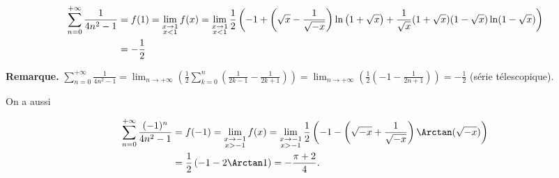 {{\begin{align*}\ensuremath
 \sum_{n=0}^{+\infty}\frac{1}{4n^2-1}&=f(1)=\displaystyle\lim_{\substack{x\rightarrow1\\ x<1}}f(x)
=\displaystyle\lim_{\substack{x\rightarrow1\\ x<1}}\frac{1}{2}\left(-1+\left(\sqrt{x}-\frac{1}{\sqrt{-x}} \right)\ln\left(1+\sqrt{x}\right) +\frac{1}{\sqrt{x}}(1+\sqrt{x})(1-\sqrt{x})\ln(1-\sqrt{x})\right)\\
 &=-\frac{1}{2}
\end{align*} 
			

\textbf{Remarque.} $\sum_{n=0}^{+\infty}\frac{1}{4n^2-1}=\lim_{n \rightarrow +\infty}\left(\frac{1}{2}\sum_{k=0}^{n}\left(\frac{1}{2k-1}-\frac{1}{2k+1}\right)\right)=\lim_{n \rightarrow +\infty}\left(\frac{1}{2}\left(-1-\frac{1}{2n+1}\right)\right)=-\frac{1}{2}$ (série télescopique).

On a aussi

\begin{align*}\ensuremath
 \sum_{n=0}^{+\infty}\frac{(-1)^n}{4n^2-1}&=f(-1)=\displaystyle\lim_{\substack{x\rightarrow-1\\ x>-1}}f(x)
=\displaystyle\lim_{\substack{x\rightarrow-1\\ x>-1}}\frac{1}{2}\left(-1-\left(\sqrt{-x}+\frac{1}{\sqrt{-x}} \right)\Arctan(\sqrt{-x})\right)\\
 &=\frac{1}{2}\left(-1-2\Arctan1\right)=-\frac{\pi+2}{4}.
\end{align*}
}
}

